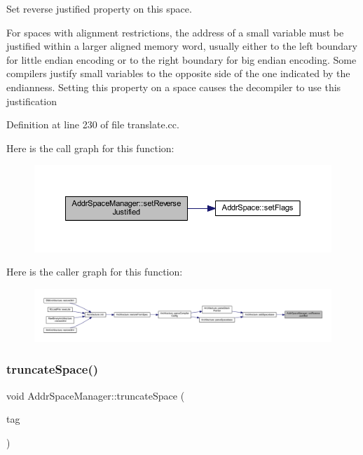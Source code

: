 Set reverse justified property on this space. 

For spaces with alignment restrictions, the address of a small variable must be justified within a larger aligned memory word, usually either to the left boundary for little endian encoding or to the right boundary for big endian encoding. Some compilers justify small variables to the opposite side of the one indicated by the endianness. Setting this property on a space causes the decompiler to use this justification 

Definition at line 230 of file translate.\+cc.

Here is the call graph for this function\+:
\nopagebreak
\begin{figure}[H]
\begin{center}
\leavevmode
\includegraphics[width=350pt]{class_addr_space_manager_abdab85595c68e18ab86dd42af914f35b_cgraph}
\end{center}
\end{figure}
Here is the caller graph for this function\+:
\nopagebreak
\begin{figure}[H]
\begin{center}
\leavevmode
\includegraphics[width=350pt]{class_addr_space_manager_abdab85595c68e18ab86dd42af914f35b_icgraph}
\end{center}
\end{figure}
\mbox{\label{class_addr_space_manager_aef7d980ea2fc0c6450e941fd7dbec7e6}} 
\subsubsection{\texorpdfstring{truncateSpace()}{truncateSpace()}}
{\footnotesize\ttfamily void Addr\+Space\+Manager\+::truncate\+Space (\begin{DoxyParamCaption}\item[{const \mbox{\hyperlink{class_truncation_tag}{Truncation\+Tag}} \&}]{tag }\end{DoxyParamCaption})}



